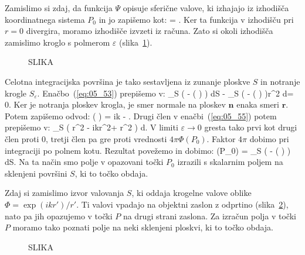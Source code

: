 Zamislimo si zdaj, da funkcija $\Psi$ opisuje sferične valove, ki
izhajajo iz izhodišča koordinatnega sistema $P_0$ in jo zapišemo kot:
\beq
\Psi = .
\label{eq:05_54}
\eeq
Ker ta funkcija v izhodišču pri $r=0$ divergira, moramo izhodišče
izvzeti iz računa. Zato si okoli izhodišča zamislimo kroglo s 
polmerom $\varepsilon$ (slika~\ref{fig:05_Green}).
\begin{figure}[ht]
\centering
\def\svgwidth{120truemm} 
%
\caption{SLIKA}
\label{fig:05_Green}
\end{figure}
Celotna integracijska površina je tako sestavljena iz zunanje ploskve
$S$ in notranje krogle $S_\varepsilon$. Enačbo~(\ref{eq:05_53}) prepišemo v:
\beq
\oint_S \left(  -
\Phi{}\left(  \right) \right) dS -
\oint_{S\varepsilon} \left(  -
\Phi{}\left(  \right) \right)r^2 d\Omega = 0.
\label{eq:05_55}
\eeq
Ker je notranja ploskev krogla, je smer normale na ploskev $\mathbf{n}$ enaka smeri $\mathbf{r}$.
Potem zapišemo odvod:
\beq
{}\left( \right)  = ik  - .
\label{eq:05_56}
\eeq
Drugi člen v enačbi~(\ref{eq:05_55}) potem prepišemo v:
\beq
\oint_{S\varepsilon} \left( r^2 -
ikr^2\Phi + \Phi r^2 \right) d\Omega.
\label{eq:05_57}
\eeq
V limiti $\varepsilon \to 0$ gresta tako prvi kot 
drugi člen proti 0, tretji člen pa gre proti vrednosti $4\pi \Phi(P_0)$. Faktor $4\pi$ 
dobimo pri integraciji po polnem kotu. Rezultat povežemo in dobimo:
\beq
\Phi(P_0) =  \oint_S \left(  -
\Phi{}\left(  \right) \right) dS.
\label{eq:05_58}
\eeq
Na ta način smo polje v opazovani točki $P_0$ izrazili s skalarnim poljem na sklenjeni površini
$S$, ki to točko obdaja.

Zdaj si zamislimo izvor valovanja $S$, ki oddaja krogelne valove oblike $\Phi = \exp(ikr')/r'$. Ti valovi
vpadajo na objektni zaslon z odprtino (slika~\ref{fig:05_Kirchhoff}), nato pa jih opazujemo 
v točki $P$ na drugi strani zaslona. Za izračun polja v točki $P$ moramo tako poznati polje na neki
sklenjeni ploskvi, ki to točko obdaja.
\begin{figure}[ht]
\centering
\def\svgwidth{120truemm} 
%
\caption{SLIKA}
\label{fig:05_Kirchhoff}
\end{figure}

